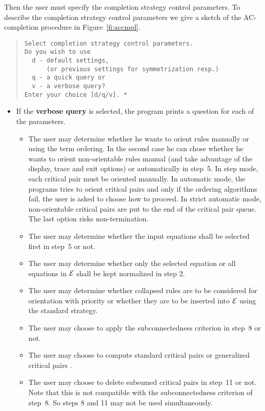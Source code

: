 Then the user must specify the completion strategy control parameters.
To describe the completion strategy control parameters we give a sketch
of the AC-completion procedure in Figure~\ref{fi:accmpl}.

\begin{quote}
\begin{verbatim}
Select completion strategy control parameters.
Do you wish to use
  d - default settings, 
      (or previous settings for symmetrization resp.)
  q - a quick query or
  v - a verbose query? 
Enter your choice [d/q/v]. *
\end{verbatim}
\end{quote}
\begin{itemize}
\item
If the {\bf verbose query} is selected, the program prints a question
for each of the parameters.
\begin{itemize}
 \item The user may determine whether he wants to orient rules manually
        or using the term ordering.
       In the second case he can chose whether he wants to orient
       non-orientable rules manual (and take advantage of the
       display, trace and exit options) or automatically in step~5.
       In step mode, each critical pair must be oriented manually. 
       In automatic mode, the programs tries to orient critical pairs
       and only if the ordering algorithms fail, the user is asked to
       choose how to proceed. 
       In strict automatic mode, non-orientable
       critical pairs are put to the end of the critical pair queue.
       The last option risks non-termination.
 \item The user may determine whether the input equations shall be
       selected first in step~5  or not.
 \item The user may determine whether only the selected equation or
        all equations in $\cal E$ shall be  kept normalized in step 2.
 \item The user may determine whether collapsed rules are to be
       considered for orientation with priority or whether they are 
       to be inserted  into $\cal E$ using the standard strategy.
 \item The user may choose to apply the subconnectedness criterion in
       step~8 or not.
 \item The user may choose to compute standard critical pairs or
       generalized critical pairs \cite{Buendgen:94}.
 \item The user may choose to delete subsumed critical pairs in step~11
       or not.
       Note that this is not compatible with the subconnectedness
       criterion of step~8. So steps 8 and 11 may not be used
       simultaneously.


\end{itemize}
\end{itemize}
